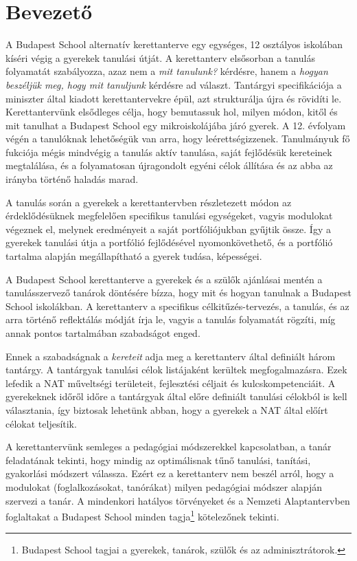 \chapter{Bevezető}
A Budapest School alternatív kerettanterve egy egységes, 12 osztályos iskolában kíséri végig a gyerekek tanulási útját. A kerettanterv elsősorban a tanulás folyamatát szabályozza, azaz nem a \emph{mit tanulunk?} kérdésre, hanem a \emph{hogyan beszéljük meg, hogy mit tanuljunk} kérdésre ad választ. Tantárgyi specifikációja a miniszter által kiadott kerettantervekre\cite{ofi:kerettanterv} épül, azt strukturálja újra és rövidíti le. Kerettantervünk elsődleges célja, hogy bemutassuk hol, milyen módon, kitől és mit tanulhat a Budapest School egy mikroiskolájába járó gyerek. A 12. évfolyam végén a tanulóknak lehetőségük van arra, hogy leérettségizzenek. Tanulmányuk fő fukciója mégis mindvégig a tanulás aktív tanulása, saját fejlődésük kereteinek megtalálása, és a folyamatosan újragondolt egyéni célok állítása és az abba az irányba történő haladás marad.   

A tanulás során a gyerekek a kerettantervben részletezett módon az érdeklődésüknek megfelelően specifikus tanulási egységeket, vagyis modulokat végeznek el, melynek eredményeit a saját portfóliójukban gyűjtik össze. Így a gyerekek tanulási útja a portfólió fejlődésével nyomonkövethető, és a portfólió tartalma alapján megállapítható a gyerek tudása, képességei.

A Budapest School kerettanterve a gyerekek és a szülők ajánlásai mentén a tanulásszervező tanárok döntésére bízza, hogy mit és hogyan tanulnak a Budapest School iskolákban. A kerettanterv a specifikus célkitűzés-tervezés, a tanulás, és az arra történő reflektálás módját írja le, vagyis a tanulás folyamatát rögzíti, míg annak pontos tartalmában szabadságot enged.

Ennek a szabadságnak a \emph{kereteit} adja meg a kerettanterv által definiált három tantárgy. A tantárgyak tanulási célok listájaként kerültek megfogalmazásra. Ezek lefedik a NAT műveltségi területeit, fejlesztési céljait és kulcskompetenciáit. A gyerekeknek időről időre a tantárgyak által előre definiált tanulási célokból is kell választania, így biztosak lehetünk abban, hogy a gyerekek a NAT által előírt célokat teljesítik. 

A kerettantervünk semleges a pedagógiai módszerekkel kapcsolatban, a tanár feladatának tekinti, hogy mindig az optimálisnak tűnő tanulási, tanítási, gyakorlási módszert válassza. Ezért ez a kerettanterv nem beszél arról, hogy a modulokat (foglalkozásokat, tanórákat) milyen pedagógiai módszer alapján szervezi a tanár. A mindenkori hatályos törvényeket és a Nemzeti Alaptantervben foglaltakat a Budapest School minden tagja\footnote{Budapest School tagjai a gyerekek, tanárok, szülők és az adminisztrátorok.} kötelezőnek tekinti.

